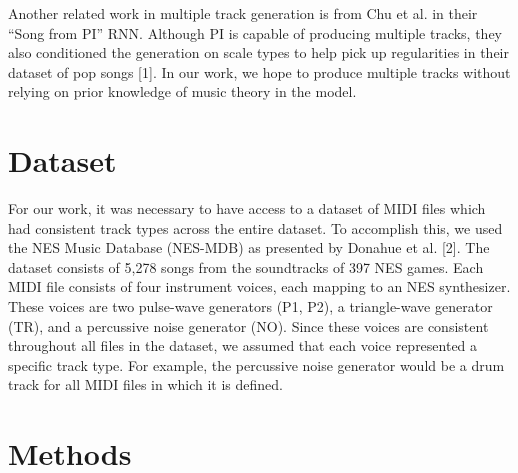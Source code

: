 \documentclass{article}
\begin{document}
Another related work in multiple track generation is from Chu et al. in their “Song from PI” RNN. Although PI is capable of producing multiple tracks, they also conditioned the generation on scale types to help pick up regularities in their dataset of pop songs [1]. In our work, we hope to produce multiple tracks without relying on prior knowledge of music theory in the model.


\section{Dataset}


For our work, it was necessary to have access to a dataset of MIDI files which had consistent track types across the entire dataset. To accomplish this, we used the NES Music Database (NES-MDB) as presented by Donahue et al. [2]. The dataset consists of 5,278 songs from the soundtracks of 397 NES games. Each MIDI file consists of four instrument voices, each mapping to an NES synthesizer. These voices are two pulse-wave generators (P1, P2), a triangle-wave generator (TR), and a percussive noise generator (NO). Since these voices are consistent throughout all files in the dataset, we assumed that each voice represented a specific track type. For example, the percussive noise generator would be a drum track for all MIDI files in which it is defined.


\section{Methods}

\end{document}
